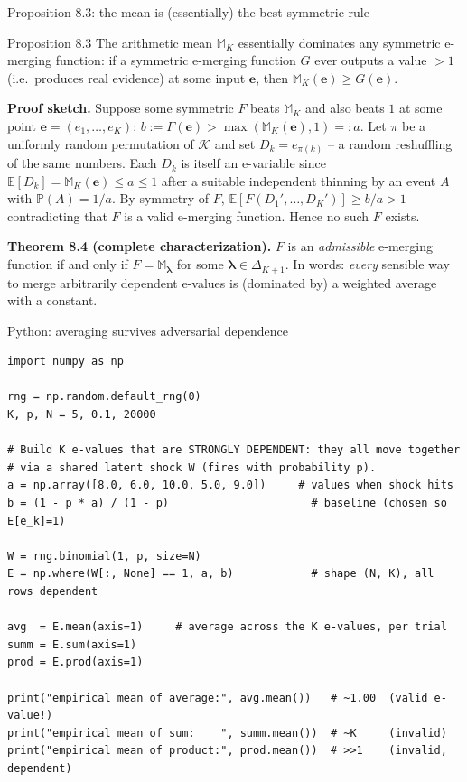 \documentclass[aspectratio=169,10pt]{beamer}
\newcommand{\E}{\mathbb{E}}
\newcommand{\Pb}{\mathbb{P}}
\newcommand{\calK}{\mathcal{K}}
\begin{document}
\begin{frame}{Proposition 8.3: the mean is (essentially) the best symmetric rule}
  \begin{block}{Proposition 8.3}
    The arithmetic mean $\mathbb{M}_K$ essentially dominates any symmetric e-merging function: if a symmetric e-merging function $G$ ever outputs a value $>1$ (i.e.\ produces real evidence) at some input $\mathbf{e}$, then $\mathbb{M}_K(\mathbf{e}) \geq G(\mathbf{e})$.
  \end{block}

  \textbf{Proof sketch.} Suppose some symmetric $F$ beats $\mathbb{M}_K$ and also beats $1$ at some point $\mathbf{e}=(e_1,\dots,e_K)$: $b:=F(\mathbf e) > \max(\mathbb{M}_K(\mathbf e),1)=:a$. Let $\pi$ be a uniformly random permutation of $\calK$ and set $D_k = e_{\pi(k)}$ -- a random reshuffling of the same numbers. Each $D_k$ is itself an e-variable since $\E[D_k]=\mathbb{M}_K(\mathbf e)\leq a \leq 1$ after a suitable independent thinning by an event $A$ with $\Pb(A)=1/a$. By symmetry of $F$, $\E[F(D_1',\dots,D_K')] \geq b/a > 1$ -- contradicting that $F$ is a valid e-merging function. Hence no such $F$ exists.

  \vspace{0.2cm}
  \textbf{Theorem 8.4 (complete characterization).} $F$ is an \emph{admissible} e-merging function if and only if $F = \mathbb{M}_{\boldsymbol\lambda}$ for some $\boldsymbol\lambda \in \Delta_{K+1}$. In words: \emph{every} sensible way to merge arbitrarily dependent e-values is (dominated by) a weighted average with a constant.
\end{frame}

\begin{frame}[fragile]{Python: averaging survives adversarial dependence}
  \begin{lstlisting}
import numpy as np

rng = np.random.default_rng(0)
K, p, N = 5, 0.1, 20000

# Build K e-values that are STRONGLY DEPENDENT: they all move together
# via a shared latent shock W (fires with probability p).
a = np.array([8.0, 6.0, 10.0, 5.0, 9.0])     # values when shock hits
b = (1 - p * a) / (1 - p)                      # baseline (chosen so E[e_k]=1)

W = rng.binomial(1, p, size=N)
E = np.where(W[:, None] == 1, a, b)            # shape (N, K), all rows dependent

avg  = E.mean(axis=1)     # average across the K e-values, per trial
summ = E.sum(axis=1)
prod = E.prod(axis=1)

print("empirical mean of average:", avg.mean())   # ~1.00  (valid e-value!)
print("empirical mean of sum:    ", summ.mean())  # ~K     (invalid)
print("empirical mean of product:", prod.mean())  # >>1    (invalid, dependent)
  \end{lstlisting}
\end{frame}
\end{document}
